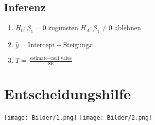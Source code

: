 \documentclass[10pt,a4paper,landscape]{article}
\begin{document}
\begin{multicols}{4}
\subsection{Inferenz}
\begin{enumerate}
\item $H_0: \beta_1=0$ zugunsten $H_A: \beta_1 \neq 0$ ablehnen
\item $\hat{y}= \text{Intercept} + \text{Steigung}x$
\item $T = \frac{\text{estimate} - \text{null value}}{\text{SE}}$
\end{enumerate}


\section{Entscheidungshilfe}
\texttt{[image: Bilder/1.png]} 
\texttt{[image: Bilder/2.png]} 

\end{multicols}
\end{document}
